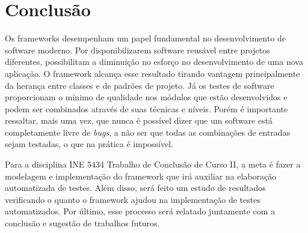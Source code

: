 \documentclass[
    12pt,       %
    openright,      %
    twoside,      %
    a4paper,      %
    english,      %
    french,       %
    spanish,      %
    brazil,       %
    ]{abntex2}
\begin{document}
  \chapter{Conclusão}
    Os frameworks desempenham um papel fundamental no desenvolvimento de software moderno. Por
    disponibilizarem software reusável entre projetos diferentes, possibilitam a diminuição no
    esforço no desenvolvimento de uma nova aplicação. O framework alcança esse resultado tirando
    vantagem principalmente da herança entre classes e de padrões de projeto. Já os testes de
    software proporcionam o mínimo de qualidade nos módulos que estão desenvolvidos e podem
    ser combinados através de suas técnicas e níveis. Porém é importante ressaltar, mais uma
    vez, que nunca é possível dizer que um software está completamente livre de \textit{bugs},
    a não ser que todas as combinações de entradas sejam testadas, o que na prática é impossível.

    Para a disciplina INE 5434 Trabalho de Conclusão de Curso II, a meta é fazer a modelagem e
    implementação do framework que irá auxiliar na elaboração automatizada de testes. Além
    disso, será feito um estudo de resultados verificando o quanto o framework ajudou
    na implementação de testes automatizados. Por último, esse processo será relatado juntamente com a
    conclusão e sugestão de trabalhos futuros.





\end{document}
